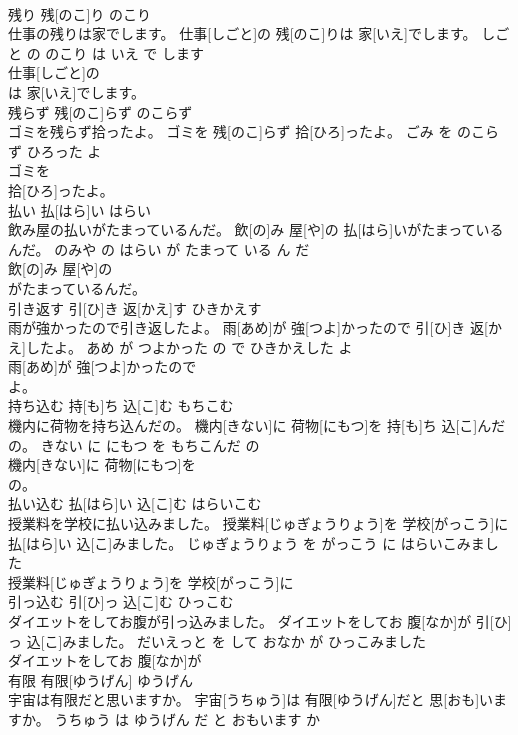 \documentclass[8pt]{extreport}
\begin{document}
\begin{CJK}{UTF8}{min}
\\	残り	残[のこ]り	のこり	
\\	仕事の残りは家でします。	仕事[しごと]の 残[のこ]りは 家[いえ]でします。	しごと の のこり は いえ で します	
\\	仕事[しごと]の
\\	は 家[いえ]でします。			
\\	残らず	残[のこ]らず	のこらず	
\\	ゴミを残らず拾ったよ。	ゴミを 残[のこ]らず 拾[ひろ]ったよ。	ごみ を のこらず ひろった よ	
\\	ゴミを
\\	拾[ひろ]ったよ。			
\\	払い	払[はら]い	はらい	
\\	飲み屋の払いがたまっているんだ。	飲[の]み 屋[や]の 払[はら]いがたまっているんだ。	のみや の はらい が たまって いる ん だ	
\\	飲[の]み 屋[や]の
\\	がたまっているんだ。			
\\	引き返す	引[ひ]き 返[かえ]す	ひきかえす	
\\	雨が強かったので引き返したよ。	雨[あめ]が 強[つよ]かったので 引[ひ]き 返[かえ]したよ。	あめ が つよかった の で ひきかえした よ	
\\	雨[あめ]が 強[つよ]かったので
\\	よ。			
\\	持ち込む	持[も]ち 込[こ]む	もちこむ	
\\	機内に荷物を持ち込んだの。	機内[きない]に 荷物[にもつ]を 持[も]ち 込[こ]んだの。	きない に にもつ を もちこんだ の	
\\	機内[きない]に 荷物[にもつ]を
\\	の。			
\\	払い込む	払[はら]い 込[こ]む	はらいこむ	
\\	授業料を学校に払い込みました。	授業料[じゅぎょうりょう]を 学校[がっこう]に 払[はら]い 込[こ]みました。	じゅぎょうりょう を がっこう に はらいこみました	
\\	授業料[じゅぎょうりょう]を 学校[がっこう]に
\\	引っ込む	引[ひ]っ 込[こ]む	ひっこむ	
\\	ダイエットをしてお腹が引っ込みました。	ダイエットをしてお 腹[なか]が 引[ひ]っ 込[こ]みました。	だいえっと を して おなか が ひっこみました	
\\	ダイエットをしてお 腹[なか]が
\\	有限	有限[ゆうげん]	ゆうげん	
\\	宇宙は有限だと思いますか。	宇宙[うちゅう]は 有限[ゆうげん]だと 思[おも]いますか。	うちゅう は ゆうげん だ と おもいます か	

\end{CJK}
\end{document}
